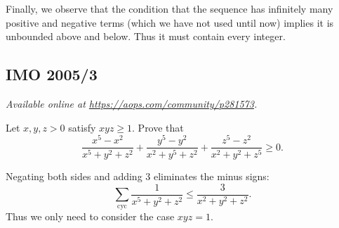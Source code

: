 \documentclass[11pt]{scrartcl}
\begin{document}
Finally, we observe that the condition that
the sequence has infinitely many positive and negative terms
(which we have not used until now)
implies it is unbounded above and below.
Thus it must contain every integer.
\pagebreak

\subsection{IMO 2005/3}
\textsl{Available online at \url{https://aops.com/community/p281573}.}
\begin{mdframed}[style=mdpurplebox,frametitle={Problem statement}]
Let $x,y,z > 0$ satisfy $xyz\geq 1$. Prove that
\[ \frac { x^5-x^2 }{x^5+y^2+z^2}
  + \frac {y^5-y^2}{x^2+y^5+z^2}
  + \frac {z^5-z^2}{x^2+y^2+z^5} \geq 0. \]
\end{mdframed}
Negating both sides and adding $3$ eliminates the minus signs:
\[ \sum_{\text{cyc}} \frac{1}{x^5+y^2+z^2}
  \le \frac{3}{x^2+y^2+z^2}. \]
Thus we only need to consider the case $xyz = 1$.
\end{document}
